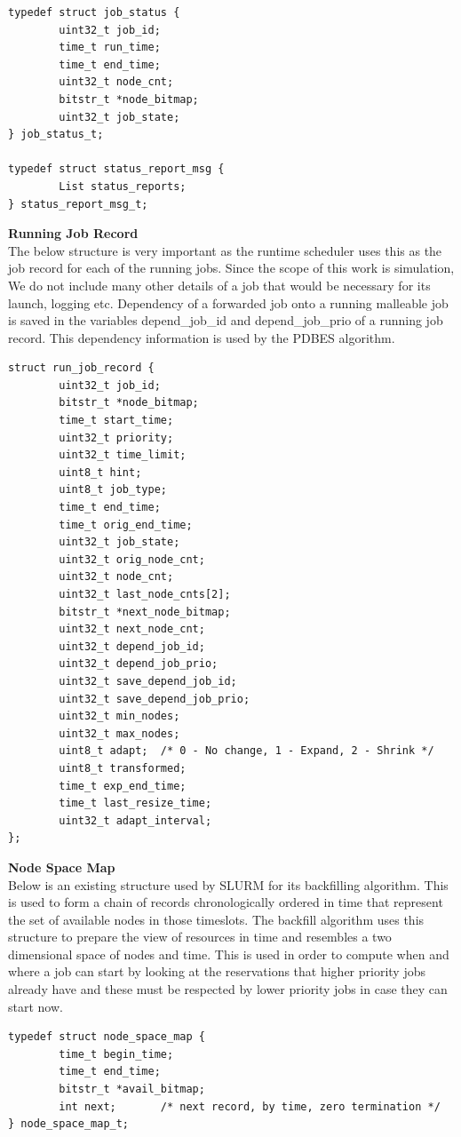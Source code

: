 \begin{lstlisting}[mathescape]
typedef struct job_status {
        uint32_t job_id;
        time_t run_time;
        time_t end_time;
        uint32_t node_cnt;
        bitstr_t *node_bitmap;
        uint32_t job_state;
} job_status_t;

typedef struct status_report_msg {
        List status_reports;
} status_report_msg_t;
\end{lstlisting}
\textbf{Running Job Record}\\
The below structure is very important as the runtime scheduler uses this as the job record for each of the running jobs. Since the scope of this work is simulation, We do not include many other details of a job that would be necessary for its launch, logging etc. Dependency of a forwarded job onto a running malleable job is saved in the variables depend\_job\_id and depend\_job\_prio of a running job record. This dependency information is used by the PDBES algorithm.
\begin{lstlisting}[mathescape]
struct run_job_record {
        uint32_t job_id;
        bitstr_t *node_bitmap;
        time_t start_time;
        uint32_t priority;
        uint32_t time_limit;
        uint8_t hint;
        uint8_t job_type;
        time_t end_time;
        time_t orig_end_time;
        uint32_t job_state;
        uint32_t orig_node_cnt;
        uint32_t node_cnt;
        uint32_t last_node_cnts[2];
        bitstr_t *next_node_bitmap;
        uint32_t next_node_cnt;
        uint32_t depend_job_id;
        uint32_t depend_job_prio;
        uint32_t save_depend_job_id;
        uint32_t save_depend_job_prio;
        uint32_t min_nodes;
        uint32_t max_nodes;
        uint8_t adapt;  /* 0 - No change, 1 - Expand, 2 - Shrink */
        uint8_t transformed;
        time_t exp_end_time;
        time_t last_resize_time;
        uint32_t adapt_interval;
};
\end{lstlisting}
\textbf{Node Space Map}\\
Below is an existing structure used by SLURM for its backfilling algorithm. This is used to form a chain of records chronologically ordered in time that represent the set of available nodes in those timeslots. The backfill algorithm uses this structure to prepare the view of resources in time and resembles a two dimensional space of nodes and time. This is used in order to compute when and where a job can start by looking at the reservations that higher priority jobs already have and these must be respected by lower priority jobs in case they can start now.
\begin{lstlisting}[mathescape]
typedef struct node_space_map {
        time_t begin_time;
        time_t end_time;
        bitstr_t *avail_bitmap;
        int next;       /* next record, by time, zero termination */
} node_space_map_t;
\end{lstlisting}
